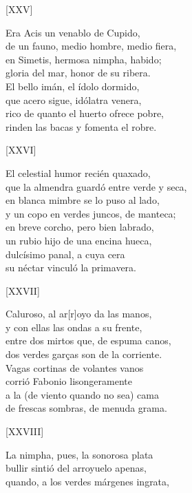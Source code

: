 \documentclass[11pt,a4paper,twoside]{article}
\begin{document}
\begin{center}
	[XXV]
\end{center}\pstart
Era Acis un venablo de Cupido,\\
de un fauno, medio hombre, medio fiera,\\
en Simetis, hermosa nimpha, habido;\\
gloria del mar, honor de su ribera.\\
El bello imán, el ídolo dormido,\\
que acero sigue, idólatra venera,\\
rico de quanto el huerto ofrece pobre,\\
rinden las bacas y fomenta el robre.\par\pend
%
\begin{center}
	[XXVI]
\end{center}\pstart
El celestial humor recién quaxado,\\
que la almendra guardó entre verde y seca,\\
en blanca mimbre se lo puso al lado,\\
y un copo en verdes juncos, de manteca;\\
en breve corcho, pero bien labrado,\\
un rubio hijo de una encina hueca,\\
dulcísimo panal, a cuya cera\\
su néctar vinculó la primavera.\par\pend
%
\begin{center}
	[XXVII]
\end{center}\pstart
Caluroso, al ar[r]oyo da las manos,\\
y con ellas las ondas a su frente,\\
entre dos mirtos que, de espuma canos,\\
dos verdes garças son de la corriente.\\
Vagas cortinas de volantes vanos\\
corrió Fabonio lisongeramente\\
a la (de viento quando no sea) cama\\
de frescas sombras, de menuda grama.\par\pend
\newpage
%
\begin{center}
	[XXVIII]
\end{center}\pstart
La nimpha, pues, la sonorosa plata\\
bullir sintió del arroyuelo apenas,\\
quando, a los verdes márgenes ingrata,\\
\end{document}
